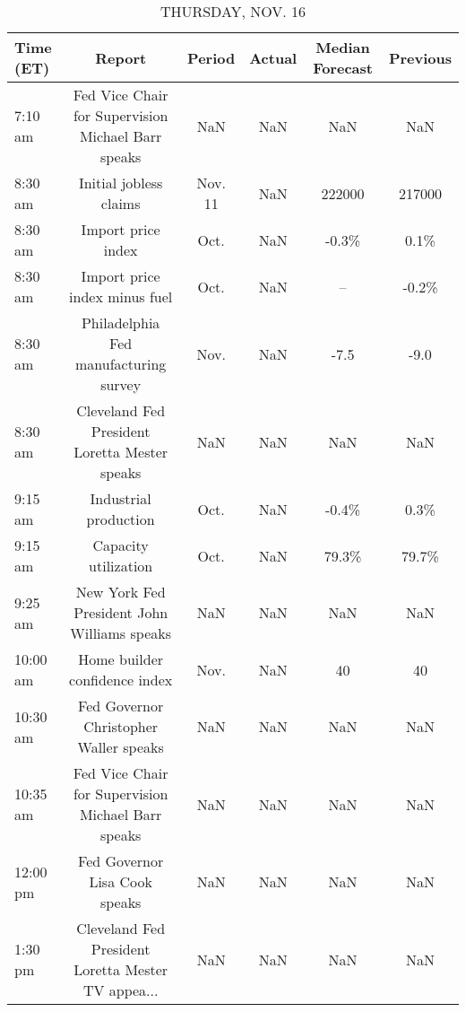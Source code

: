 \documentclass{article}%
\begin{document}
\begin{table}[htbp]%
\caption{THURSDAY, NOV. 16}%
\centering%
\begin{adjustbox}{width=1\textwidth}%
\begin{tabular}{lccccc}
\toprule
Time (ET) &                                             Report &  Period & Actual & Median Forecast & Previous \\
\midrule
  7:10 am & Fed Vice Chair for Supervision Michael Barr speaks &     NaN &    NaN &             NaN &      NaN \\
  8:30 am &                             Initial jobless claims & Nov. 11 &    NaN &          222000 &   217000 \\
  8:30 am &                                 Import price index &    Oct. &    NaN &           -0.3\% &     0.1\% \\
  8:30 am &                      Import price index minus fuel &    Oct. &    NaN &              -- &    -0.2\% \\
  8:30 am &              Philadelphia Fed manufacturing survey &    Nov. &    NaN &            -7.5 &     -9.0 \\
  8:30 am &      Cleveland Fed President Loretta Mester speaks &     NaN &    NaN &             NaN &      NaN \\
  9:15 am &                              Industrial production &    Oct. &    NaN &           -0.4\% &     0.3\% \\
  9:15 am &                               Capacity utilization &    Oct. &    NaN &           79.3\% &    79.7\% \\
  9:25 am &        New York Fed President John Williams speaks &     NaN &    NaN &             NaN &      NaN \\
 10:00 am &                      Home builder confidence index &    Nov. &    NaN &              40 &       40 \\
 10:30 am &             Fed Governor Christopher Waller speaks &     NaN &    NaN &             NaN &      NaN \\
 10:35 am & Fed Vice Chair for Supervision Michael Barr speaks &     NaN &    NaN &             NaN &      NaN \\
 12:00 pm &                      Fed Governor Lisa Cook speaks &     NaN &    NaN &             NaN &      NaN \\
  1:30 pm & Cleveland Fed President Loretta Mester TV appea... &     NaN &    NaN &             NaN &      NaN \\
\bottomrule
\end{tabular}
%
\end{adjustbox}%
\end{table}
\end{document}
